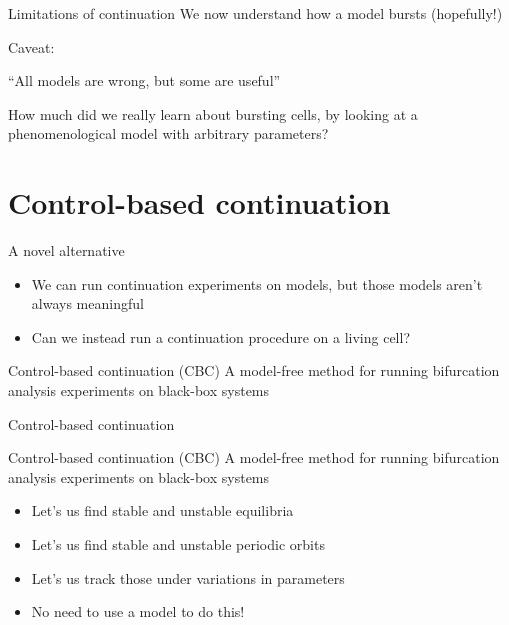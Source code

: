 \documentclass[presentation]{beamer}
\begin{document}
\begin{frame}[label={sec:orgc47626c}]{Limitations of continuation}
We now understand how a model bursts (hopefully!)

Caveat: 
\vfill
\begin{exampleblock}{}
  {\large ``All models are wrong, but some are useful''}
  \vskip5mm
  \hspace*{}
\end{exampleblock}
\vfill

How much did we really learn about bursting cells, by looking at a phenomenological model with arbitrary parameters?
\end{frame}


\section{Control-based continuation}
\label{sec:org4ab6c15}
\begin{frame}[label={sec:org7a48655}]{A novel alternative}
\begin{itemize}
\item We can run continuation experiments on models, but those models aren't always meaningful
\item Can we instead run a continuation procedure on a living cell?
\end{itemize}

\begin{block}{Control-based continuation (CBC)}
A model-free method for running bifurcation analysis experiments on black-box systems
\end{block}
\end{frame}

\begin{frame}[label={sec:org067b9d1}]{Control-based continuation}
\begin{block}{Control-based continuation (CBC)}
    A model-free method for running bifurcation analysis experiments on black-box systems
\end{block}

\begin{itemize}[<+->]
\item Let's us find stable and unstable equilibria
\item Let's us find stable and unstable periodic orbits
\item Let's us track those under variations in parameters
\item No need to use a model to do this!
\end{itemize}
\end{frame}
\end{document}
